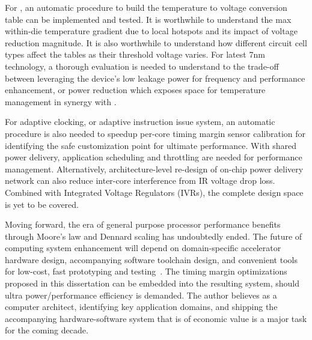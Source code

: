 For \tistates, an automatic procedure to build the temperature to voltage conversion table can be implemented and tested. It is worthwhile to understand the max within-die temperature gradient due to local hotspots and its impact of voltage reduction magnitude. It is also worthwhile to understand how different circuit cell types affect the \tistate tables as their threshold voltage varies. For latest 7nm technology, a thorough evaluation is needed to understand to the trade-off between leveraging the device's low leakage power for frequency and performance enhancement, or power reduction which exposes space for temperature management in synergy with \tistates.

For adaptive clocking, or adaptive instruction issue system, an automatic procedure is also needed to speedup per-core timing margin sensor calibration for identifying the safe customization point for ultimate performance. With shared power delivery, application scheduling and throttling are needed for performance management. Alternatively, architecture-level re-design of on-chip power delivery network can also reduce inter-core interference from IR voltage drop loss. Combined with Integrated Voltage Regulators (IVRs), the complete design space is yet to be covered.

Moving forward, the era of general purpose processor performance benefits through Moore's law and Dennard scaling has undoubtedly ended. The future of computing system enhancement will depend on domain-specific accelerator hardware design, accompanying software toolchain design, and convenient tools for low-cost, fast prototyping and testing~\cite{hennessynew}. The timing margin optimizations proposed in this dissertation can be embedded into the resulting system, should ultra power/performance efficiency is demanded. The author believes as a computer architect, identifying key application domains, and shipping the accompanying hardware-software system that is of economic value is a major task for the coming decade.